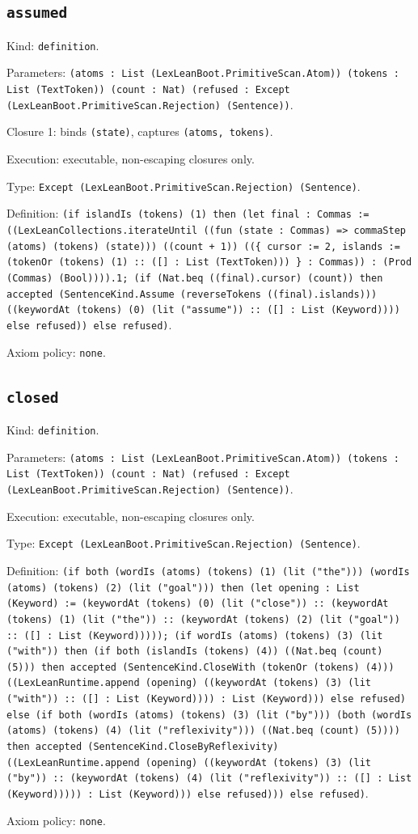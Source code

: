 \documentclass[11pt]{article}
\begin{document}
\subsection*{\texttt{assumed}}
\noindent Kind: \texttt{definition}.\par
\noindent Parameters: \texttt{(atoms : List (LexLeanBoot.PrimitiveScan.Atom)) (tokens : List (TextToken)) (count : Nat) (refused : Except (LexLeanBoot.PrimitiveScan.Rejection) (Sentence))}.\par
\noindent Closure 1: binds \texttt{(state)}, captures \texttt{(atoms, tokens)}.\par
\noindent Execution: executable, non-escaping closures only.\par
\noindent Type: \texttt{Except (LexLeanBoot.PrimitiveScan.Rejection) (Sentence)}.\par
\noindent Definition: \texttt{(if islandIs (tokens) (1) then (let final : Commas := ((LexLeanCollections.iterateUntil ((fun (state : Commas) => commaStep (atoms) (tokens) (state))) ((count + 1)) ((\{ cursor := 2, islands := (tokenOr (tokens) (1) :: ([] : List (TextToken))) \} : Commas)) : (Prod (Commas) (Bool)))).1; (if (Nat.beq ((final).cursor) (count)) then accepted (SentenceKind.Assume (reverseTokens ((final).islands))) ((keywordAt (tokens) (0) (lit ("assume")) :: ([] : List (Keyword)))) else refused)) else refused)}.\par
\noindent Axiom policy: \texttt{none}.\par
\subsection*{\texttt{closed}}
\noindent Kind: \texttt{definition}.\par
\noindent Parameters: \texttt{(atoms : List (LexLeanBoot.PrimitiveScan.Atom)) (tokens : List (TextToken)) (count : Nat) (refused : Except (LexLeanBoot.PrimitiveScan.Rejection) (Sentence))}.\par
\noindent Execution: executable, non-escaping closures only.\par
\noindent Type: \texttt{Except (LexLeanBoot.PrimitiveScan.Rejection) (Sentence)}.\par
\noindent Definition: \texttt{(if both (wordIs (atoms) (tokens) (1) (lit ("the"))) (wordIs (atoms) (tokens) (2) (lit ("goal"))) then (let opening : List (Keyword) := (keywordAt (tokens) (0) (lit ("close")) :: (keywordAt (tokens) (1) (lit ("the")) :: (keywordAt (tokens) (2) (lit ("goal")) :: ([] : List (Keyword))))); (if wordIs (atoms) (tokens) (3) (lit ("with")) then (if both (islandIs (tokens) (4)) ((Nat.beq (count) (5))) then accepted (SentenceKind.CloseWith (tokenOr (tokens) (4))) ((LexLeanRuntime.append (opening) ((keywordAt (tokens) (3) (lit ("with")) :: ([] : List (Keyword)))) : List (Keyword))) else refused) else (if both (wordIs (atoms) (tokens) (3) (lit ("by"))) (both (wordIs (atoms) (tokens) (4) (lit ("reflexivity"))) ((Nat.beq (count) (5)))) then accepted (SentenceKind.CloseByReflexivity) ((LexLeanRuntime.append (opening) ((keywordAt (tokens) (3) (lit ("by")) :: (keywordAt (tokens) (4) (lit ("reflexivity")) :: ([] : List (Keyword))))) : List (Keyword))) else refused))) else refused)}.\par
\noindent Axiom policy: \texttt{none}.\par
\end{document}
